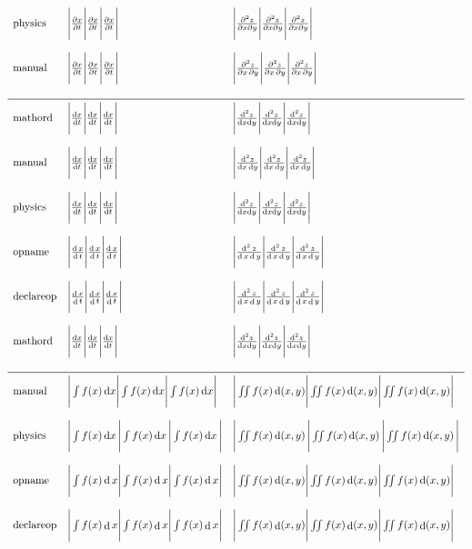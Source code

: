 \documentclass{unittest}
\DeclareMathOperator*{\ddOP}{d}
\begin{document}
$\begin{array}{llll}
\text{physics}   & \DUP{\pdv{x}{t}}       & \DUP{\pdv{z}{x}{y}}        \\\\
\text{manual}    & \DUP{\frac{\pp{x}}{\pp{t}}} & \DUP{\frac{\pp^2{z}}{\pp{x}\pp{y}}}  \\\\
\midrule
\text{mathord}   & \DUP{\frac{\ddord{x}}{\ddord{t}}} & \DUP{\frac{\ddord^2{z}}{\ddord{x}\ddord{y}}}  \\\\
\text{manual}    & \DUP{\frac{\ddalt{x}}{\ddalt{t}}} & \DUP{\frac{\ddalt^2{z}}{\ddalt{x}\ddalt{y}}}  \\\\
\text{physics}   & \DUP{\frac{\dd{x}}{\dd{t}}}       & \DUP{\frac{\dd^2{z}}{\dd{x}\dd{y}}}        \\\\
\text{opname}    & \DUP{\frac{\ddop{x}}{\ddop{t}}}   & \DUP{\frac{\ddop^2{z}}{\ddop{x}\ddop{y}}}    \\\\
\text{declareop} & \DUP{\frac{\ddOP{x}}{\ddOP{t}}}   & \DUP{\frac{\ddOP^2{z}}{\ddOP{x}\ddOP{y}}}    \\\\
\text{mathord}   & \DUP{\frac{\ddord{x}}{\ddord{t}}} & \DUP{\frac{\ddord^2{z}}{\ddord{x}\ddord{y}}}  \\\\
\midrule
\text{manual}    & \DUP{\int f(x)\ddalt{x}} & \DUP{\iint f(x)\ddalt(x,y)} \\\\
\text{physics}   & \DUP{\int f(x)\dd{x}}    & \DUP{\iint f(x)\dd(x,y)} \\\\
\text{opname}    & \DUP{\int f(x)\ddop{x}}  & \DUP{\iint f(x)\ddop(x,y)} \\\\
\text{declareop} & \DUP{\int f(x)\ddOP{x}}  & \DUP{\iint f(x)\ddOP(x,y)} \\\\
\end{array}$
\end{document}
